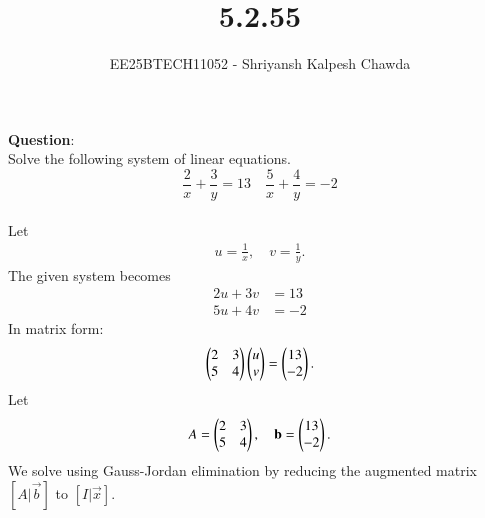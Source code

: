\documentclass[journal]{IEEEtran}
\title{5.2.55}
\author{EE25BTECH11052 - Shriyansh Kalpesh Chawda}
\begin{document}
	\maketitle
	\textbf{Question}:\\
	Solve the following system of linear equations.\[
	\frac{2}{x} + \frac{3}{y} = 13 \quad \frac{5}{x} + \frac{4}{y} = -2 \]
	\solution\\
	Let 
	\begin{align}
		u = \frac{1}{x}, \quad v = \frac{1}{y}.
	\end{align}
	The given system becomes
	\begin{align}
		2u + 3v &= 13 \\
		5u + 4v &= -2
	\end{align}
	In matrix form:
	\begin{align}
		\begin{pmatrix}2 & 3 \\ 5 & 4\end{pmatrix} \begin{pmatrix}u \\ v\end{pmatrix} = \begin{pmatrix}13 \\ -2\end{pmatrix}.
	\end{align}
	Let 
	\begin{align}
		A = \begin{pmatrix}2 & 3 \\ 5 & 4\end{pmatrix}, \quad \mathbf{b} = \begin{pmatrix}13 \\ -2\end{pmatrix}.
	\end{align}
	We solve using Gauss-Jordan elimination by reducing the augmented matrix $[A|\vec{b}]$ to $[I|\vec{x}]$.
	
\end{document}
